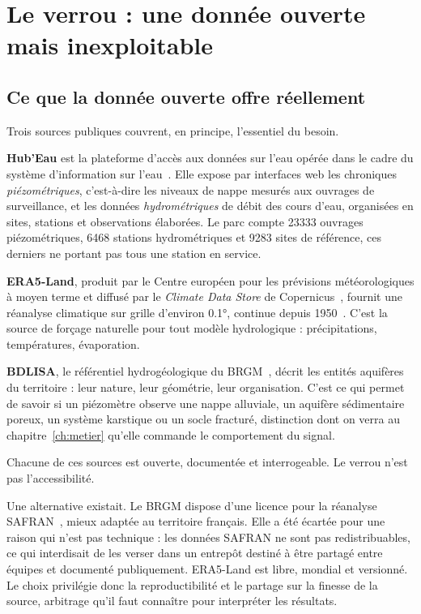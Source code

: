 \chapter{Le verrou : une donnée ouverte mais inexploitable}
\label{ch:verrou}


\section{Ce que la donnée ouverte offre réellement}

Trois sources publiques couvrent, en principe, l'essentiel du besoin.

\textbf{Hub'Eau} est la plateforme d'accès aux données sur l'eau opérée dans le cadre du système
d'information sur l'eau~\cite{hubeau}. Elle expose par interfaces web les chroniques
\emph{piézométriques}, c'est-à-dire les niveaux de nappe mesurés aux ouvrages de
surveillance, et les données
\emph{hydrométriques} de débit des cours d'eau, organisées en sites, stations et observations
élaborées. Le parc compte \num{23333} ouvrages piézométriques, \num{6468} stations
hydrométriques et \num{9283} sites de référence, ces derniers ne portant pas tous une station en
service.

\textbf{ERA5-Land}, produit par le Centre européen pour les prévisions météorologiques à moyen
terme et diffusé par le \emph{Climate Data Store} de Copernicus~\cite{cds}, fournit une
réanalyse climatique sur grille d'environ \ang{0.1}, continue depuis
1950~\cite{hersbach2020era5,munozsabater2021era5land}. C'est la source de forçage naturelle pour
tout modèle hydrologique : précipitations, températures, évaporation.

\textbf{BDLISA}, le référentiel hydrogéologique du BRGM~\cite{bdlisa}, décrit les entités
aquifères du territoire : leur nature, leur géométrie, leur organisation. C'est ce qui permet de
savoir si un piézomètre observe une nappe alluviale, un aquifère sédimentaire poreux, un système
karstique ou un socle fracturé, distinction dont on verra au chapitre~\ref{ch:metier} qu'elle
commande le comportement du signal.

Chacune de ces sources est ouverte, documentée et interrogeable. Le verrou n'est pas
l'accessibilité.

Une alternative existait. Le BRGM dispose d'une
licence pour la réanalyse SAFRAN~\cite{safran}, mieux adaptée au territoire français. Elle a été
écartée pour une raison qui n'est pas technique : les données SAFRAN ne sont pas
redistribuables, ce qui interdisait de les verser dans un entrepôt destiné à être partagé entre
équipes et documenté publiquement. ERA5-Land est libre, mondial et versionné. Le choix
privilégie donc la reproductibilité et le partage sur la finesse de la source, arbitrage qu'il
faut connaître pour interpréter les résultats.

